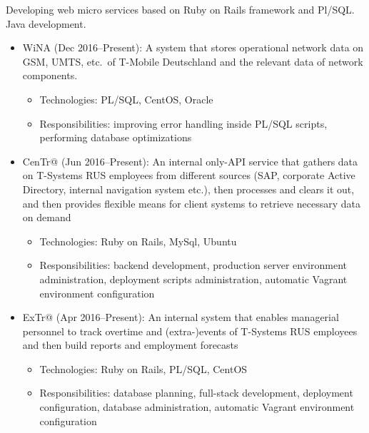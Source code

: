 \documentclass{cv}
\begin{document}
\begin{cvblock}{%
  }

  Developing web micro services based on Ruby on Rails framework and Pl/SQL\@.
  Java development.

  \begin{itemize}
    \item WiNA (Dec 2016--Present):
      A system that stores operational network data on GSM,
      UMTS, etc.\ of T-Mobile Deutschland and the relevant data of
      network components.
      \begin{itemize}
        \item Technologies: PL/SQL, CentOS, Oracle
        \item Responsibilities: improving error handling inside PL/SQL
          scripts, performing database optimizations
      \end{itemize}

    \item CenTr@ (Jun 2016--Present):
      An internal only-API service that gathers data on T-Systems RUS employees
      from different sources (SAP, corporate Active Directory,
      internal navigation system etc.), then processes and clears it out, and
      then provides flexible means for client systems to retrieve necessary
      data on demand
      \begin{itemize}
        \item Technologies: Ruby on Rails, MySql, Ubuntu
        \item Responsibilities: backend development, production server
          environment administration, deployment scripts administration,
          automatic Vagrant environment configuration
      \end{itemize}

    \item ExTr@ (Apr 2016--Present):
      An internal system that enables managerial personnel to track overtime
      and (extra-)events of T-Systems RUS employees and then build reports and
      employment forecasts
      \begin{itemize}
        \item Technologies: Ruby on Rails, PL/SQL, CentOS
        \item Responsibilities: database planning, full-stack development,
          deployment configuration, database administration, automatic Vagrant
          environment configuration
      \end{itemize}


\end{itemize}
\end{cvblock}
\end{document}
